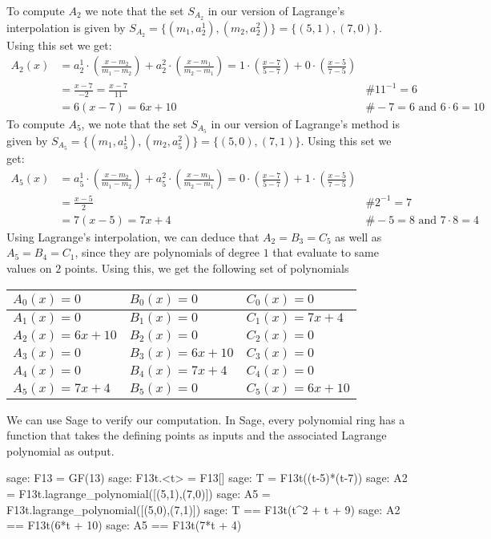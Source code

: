 \begin{example}[3-factorization]
To compute $A_2$ we note that the set $S_{A_2}$ in our version of Lagrange's interpolation  is given by $S_{A_2}=\{(m_1,a^1_2), (m_2,a_2^2)\} = \{(5,1), (7,0)\}$. Using this set we get:
\begin{align*}
A_2(x) & = a^1_2\cdot(\frac{x-m_2}{m_1-m_2}) + a^2_2\cdot(\frac{x-m_1}{m_2-m_1})
      = 1\cdot(\frac{x-7}{5-7}) + 0\cdot(\frac{x-5}{7-5}) \\
    & = \frac{x-7}{-2}
      = \frac{x-7}{11} & \text{\# } 11^{-1}=6 \\
    & = 6(x-7) 
      = 6x + 10 & \text{\# } -7 = 6 \text{ and } 6\cdot 6 = 10
\end{align*}
To compute $A_5$, we note that the set $S_{A_5}$ in our version of Lagrange's method  is given by $S_{A_5}=\{(m_1,a^1_5), (m_2,a^2_5)\} = \{(5,0), (7,1)\}$. Using this set we get:
\begin{align*}
A_5(x) & = a^1_5\cdot(\frac{x-m_2}{m_1-m_2}) + a^2_5\cdot(\frac{x-m_1}{m_2-m_1})
      = 0\cdot(\frac{x-7}{5-7}) + 1\cdot(\frac{x-5}{7-5}) \\
    & = \frac{x-5}{2} & \text{\# } 2^{-1}=7 \\
    & = 7(x-5) 
      = 7x + 4 & \text{\# } -5 = 8 \text{ and } 7\cdot 8 = 4
\end{align*}
Using Lagrange's interpolation, we can deduce that $A_2=B_3=C_5$ as well as $A_5=B_4=C_1$, since they are polynomials of degree $1$ that evaluate to same values on $2$ points. Using this, we get the following set of polynomials
\begin{center}
\begin{tabular}{|l|l|l|}\hline 
$A_{0}(x)=0 $ &$ B_{0}(x)=0   $ & $C_{0}(x)=0$ \tabularnewline\hline 
$A_1(x)=0 $ &$ B_1(x)=0   $ & $C_1(x)=7x+4$ \tabularnewline\hline 
$A_2(x)=6x+10$ &$ B_2(x)=0$ & $C_2(x)=0$ \tabularnewline\hline 
$A_3(x)=0    $ &$ B_3(x)=6x+10$ & $C_3(x)=0$ \tabularnewline\hline 
$A_4(x)=0$ &$ B_4(x)=7x+4  $ & $C_4(x)=0$ \tabularnewline\hline 
$A_5(x)=7x+4$ &$ B_5(x)=0      $ & $C_5(x)=6x+10$ \tabularnewline\hline 
\end{tabular}
\end{center}
We can use Sage to verify our computation. In Sage, every polynomial ring has a function  that takes the defining points as inputs and the associated Lagrange polynomial as output.
\begin{sagecommandline}
sage: F13 = GF(13)
sage: F13t.<t> = F13[]
sage: T = F13t((t-5)*(t-7))
sage: A2 = F13t.lagrange_polynomial([(5,1),(7,0)])
sage: A5 = F13t.lagrange_polynomial([(5,0),(7,1)])
sage: T == F13t(t^2 + t + 9)
sage: A2 == F13t(6*t + 10)
sage: A5 == F13t(7*t + 4)
\end{sagecommandline}


\end{example}

